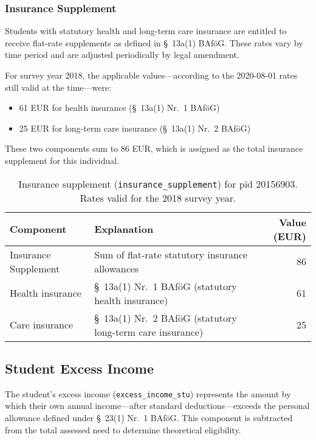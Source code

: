 \subsubsection{Insurance Supplement}
Students with statutory health and long-term care insurance are entitled to receive flat-rate supplements as defined in §~13a(1) BAföG. These rates vary by time period and are adjusted periodically by legal amendment.

For survey year 2018, the applicable values—according to the 2020-08-01 rates still valid at the time—were:
\begin{itemize}
    \item 61 EUR for health insurance (§~13a(1) Nr.~1 BAföG)
    \item 25 EUR for long-term care insurance (§~13a(1) Nr.~2 BAföG)
\end{itemize}

These two components sum to 86 EUR, which is assigned as the total insurance supplement for this individual.

\begin{table}[H]
\scriptsize
\centering
\begin{tabular}{llr}
\toprule
\textbf{Component} & \textbf{Explanation} & \textbf{Value (EUR)} \\
\midrule
Insurance Supplement & Sum of flat-rate statutory insurance allowances & 86 \\
\quad Health insurance & §~13a(1) Nr.~1 BAföG (statutory health insurance) & 61 \\
\quad Care insurance & §~13a(1) Nr.~2 BAföG (statutory long-term care insurance) & 25 \\
\bottomrule
\end{tabular}
\caption{Insurance supplement (\texttt{insurance\_supplement}) for pid 20156903. Rates valid for the 2018 survey year.}
\label{table:bafoeg_insurance}
\end{table}


\subsection{Student Excess Income}
The student’s excess income (\texttt{excess\_income\_stu}) represents the amount by which their own annual income—after standard deductions—exceeds the personal allowance defined under §~23(1) Nr.~1 BAföG. This component is subtracted from the total assessed need to determine theoretical eligibility.

